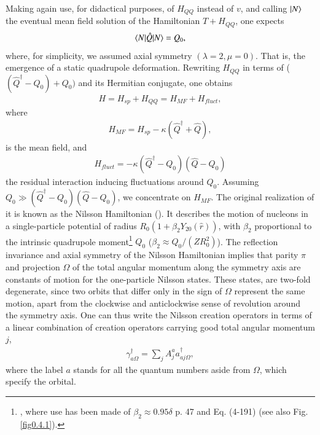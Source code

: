 Making again use, for didactical purposes, of $H_{QQ}$ instead of $v$, and calling $|{N} \rangle$ the eventual mean field solution of the Hamiltonian $T+H_{QQ}$, one expects
  \begin{align}\label{eq0.4.1}
\langle {N|\hat Q|N} \rangle=Q_0,
  \end{align}
where, for simplicity, we assumed axial symmetry $(\lambda=2,\mu=0)$. That is, the emergence of a static quadrupole deformation.
Rewriting $H_{QQ}$ in terms of ($(\hat Q^\dagger-Q_0)+Q_0)$ and its Hermitian conjugate, one obtains 
  \begin{align}\label{eq0.4.2}
H=H_{sp}+H_{QQ}=H_{MF}+H_{fluct},
\end{align}
where 
  \begin{align}\label{eq0.4.3}
H_{MF}=H_{sp}-\kappa(\hat Q^\dagger+\hat Q),
\end{align}
is the mean field, and
\begin{align}\label{eq0.4.4}
H_{fluct}=-\kappa(\hat Q^\dagger-Q_0)(\hat Q-Q_0)
\end{align}
the residual interaction inducing fluctuations around $Q_0$. Assuming $Q_0\gg (\hat Q^\dagger-Q_0)(\hat Q-Q_0)$, we concentrate on $H_{MF}$. The original realization of it is known as the Nilsson Hamiltonian (\cite{Nilsson:55}). It describes the motion of nucleons in a single-particle potential of radius $R_0(1+\beta_2Y_{20}(\hat r))$, with $\beta_2$ proportional to the intrinsic quadrupole moment\footnote{\cite{Mottelson:59}, where use has been made of $\beta_2\approx0.95\delta$ \cite{Bohr:75} p. 47 and Eq. (4-191) (see also Fig. \ref{fig0.4.1}).} $Q_0$ ($\beta_2\approx Q_0/(ZR_0^2)$). The reflection invariance and axial symmetry of the Nilsson Hamiltonian implies that parity $\pi$ and projection $\Omega$ of the total angular momentum along the symmetry axis are constants of motion for the one-particle Nilsson states. These states, are two-fold degenerate, since two orbits that differ only in the sign of $\Omega$ represent the same motion, apart from the clockwise and anticlockwise sense of revolution around the symmetry axis. One can thus write the Nilsson creation operators in terms of a linear combination of creation operators carrying good total angular momentum $j$, 
\begin{align}\label{eq0.4.5}
\gamma^\dagger_{a\Omega}=\sum_jA_j^aa^\dagger_{aj\Omega},
\end{align}
where the label $a$ stands for all the quantum numbers aside from $\Omega$, which specify the orbital. 

